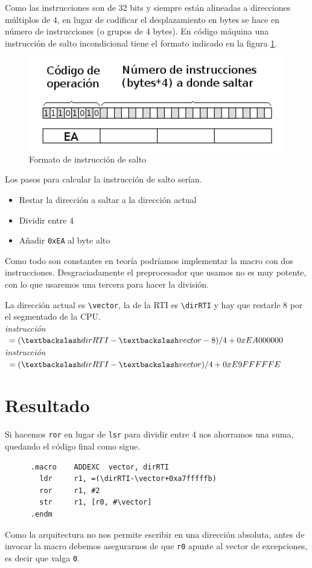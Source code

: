 Como las instrucciones son de 32 bits y siempre están alineadas a direcciones múltiplos
de 4, en lugar de codificar el desplazamiento en bytes se hace en número de
instrucciones (o grupos de 4 bytes). En código máquina una instrucción de salto
incondicional tiene el formato indicado en la figura \ref{fig:codsalto}.

\begin{figure}[h]
  \centering
    \includegraphics[width=14cm]{graphs/codsalto.png}
  \caption{Formato de instrucción de salto}
  \label{fig:codsalto}
\end{figure}

Los pasos para calcular la instrucción de salto serían.

\begin{itemize}
  \item Restar la dirección a saltar a la dirección actual
  \item Dividir entre 4
  \item Añadir {\tt 0xEA} al byte alto
\end{itemize}

Como todo son constantes en teoría podríamos implementar la
macro con dos instrucciones. Desgraciadamente el preprocesador
que usamos no es muy potente, con lo que usaremos una tercera
para hacer la división.

La dirección actual es {\tt \textbackslash vector}, la de la RTI
es {\tt \textbackslash dirRTI} y hay que restarle 8 por el
segmentado de la CPU.
\\
{\it instrucción }$ = (\textbackslash dirRTI-\textbackslash vector-8)/4 + 0xEA000000$ \\
{\it instrucción }$ = (\textbackslash dirRTI-\textbackslash vector)/4 + 0xE9FFFFFE$

\section{Resultado}

Si hacemos {\tt ror} en lugar de {\tt lsr} para dividir entre 4 nos
ahorramos una suma, quedando el código final como sigue.

\begin{lstlisting}
      .macro    ADDEXC  vector, dirRTI
        ldr     r1, =(\dirRTI-\vector+0xa7fffffb)
        ror     r1, #2
        str     r1, [r0, #\vector]
      .endm
\end{lstlisting}

Como la arquitectura no nos permite escribir en una dirección absoluta, antes
de invocar la macro debemos asegurarnos de que {\tt r0} apunte al vector de
excepciones, es decir que valga {\tt 0}.

\chapterend
